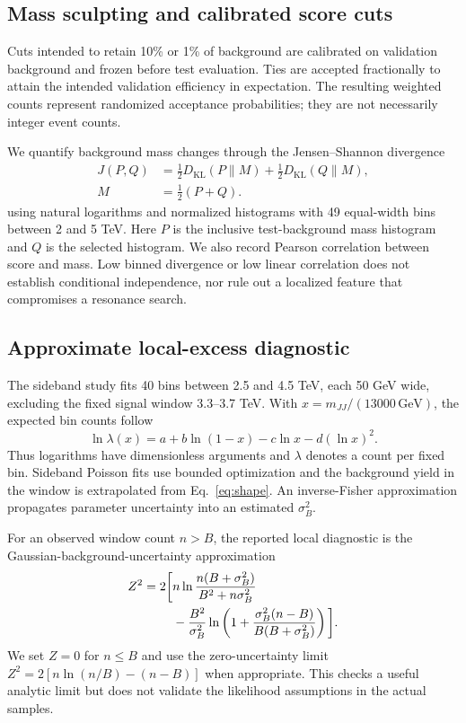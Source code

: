 \documentclass[reprint,aps,pra,amsmath,amssymb,floatfix,raggedbottom]{revtex4-2}
\newcommand{\mjj}{m_{JJ}}
\begin{document}
\subsection{Mass sculpting and calibrated score cuts}
Cuts intended to retain 10\% or 1\% of background are calibrated on validation background and frozen before test evaluation. Ties are accepted fractionally to attain the intended validation efficiency in expectation. The resulting weighted counts represent randomized acceptance probabilities; they are not necessarily integer event counts.

We quantify background mass changes through the Jensen--Shannon divergence
\begin{equation}
\begin{aligned} J(P,Q)&=\tfrac12D_{\mathrm{KL}}(P\|M)+\tfrac12D_{\mathrm{KL}}(Q\|M),\\
 M&=\tfrac12(P+Q).\end{aligned}
\end{equation}
using natural logarithms and normalized histograms with 49 equal-width bins between 2 and 5 TeV. Here $P$ is the inclusive test-background mass histogram and $Q$ is the selected histogram. We also record Pearson correlation between score and mass. Low binned divergence or low linear correlation does not establish conditional independence, nor rule out a localized feature that compromises a resonance search.

\subsection{Approximate local-excess diagnostic}
The sideband study fits 40 bins between 2.5 and 4.5 TeV, each 50 GeV wide, excluding the fixed signal window 3.3--3.7 TeV. With $x=\mjj/(13000\,\mathrm{GeV})$, the expected bin counts follow
\begin{equation}\label{eq:shape}
 \ln\lambda(x)=a+b\ln(1-x)-c\ln x-d(\ln x)^2.
\end{equation}
Thus logarithms have dimensionless arguments and $\lambda$ denotes a count per fixed bin. Sideband Poisson fits use bounded optimization and the background yield in the window is extrapolated from Eq.~\eqref{eq:shape}. An inverse-Fisher approximation propagates parameter uncertainty into an estimated $\sigma_B^2$.

For an observed window count $n>B$, the reported local diagnostic is the Gaussian-background-uncertainty approximation \cite{cowan}
\begin{align}\label{eq:z}
 Z^2=2\bigg[&n\ln{n(B+\sigma_B^2)\over B^2+n\sigma_B^2}\nonumber\\
 &-{B^2\over\sigma_B^2}\ln\left(1+{\sigma_B^2(n-B)\over B(B+\sigma_B^2)}\right)\bigg].
\end{align}
We set $Z=0$ for $n\leq B$ and use the zero-uncertainty limit $Z^2=2[n\ln(n/B)-(n-B)]$ when appropriate. This checks a useful analytic limit but does not validate the likelihood assumptions in the actual samples.
\end{document}
